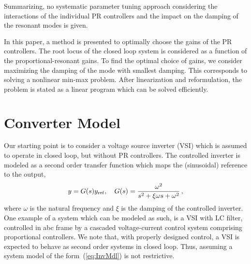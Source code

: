 \documentclass[conference,10pt]{IEEEtran}
\begin{document}
Summarizing, no systematic parameter tuning approach considering the interactions of the individual PR controllers and the impact on the damping of the resonant modes is given.

In this paper, a method is presented to optimally choose the gains of the PR controllers. The root locus of the closed loop system is considered as a function of the proportional-resonant gains. To find the optimal choice of gains, we consider maximizing the damping of the mode with smallest damping. This corresponds to solving a nonlinear min-max problem. After linearization and reformulation, the problem is stated as a linear program which can be solved efficiently.






\section{Converter Model}

%

Our starting point is to consider a voltage source inverter (VSI) which is assumed to operate in closed loop, but without PR controllers.  The controlled inverter is modeled as a second order transfer function which maps the (sinusoidal) reference to the output,
\begin{align}
\label{eq:InvMdl}
y = G(s)y_{\rm ref},\quad G(s) = \frac{\omega^2}{s^2+\xi\omega s + \omega^2}\,,
\end{align}
where $\omega$ is the natural frequency and $\xi$ is the damping of the controlled inverter. One example of a system which can be modeled as such,
is a VSI with LC filter, %
controlled in abc frame by a cascaded voltage-current control system comprising proportional controllers.
We note that, with properly designed control, a VSI is expected to behave as second order systems in closed loop. Thus, assuming a system model of the form~(\ref{eq:InvMdl}) is not restrictive.
\end{document}
